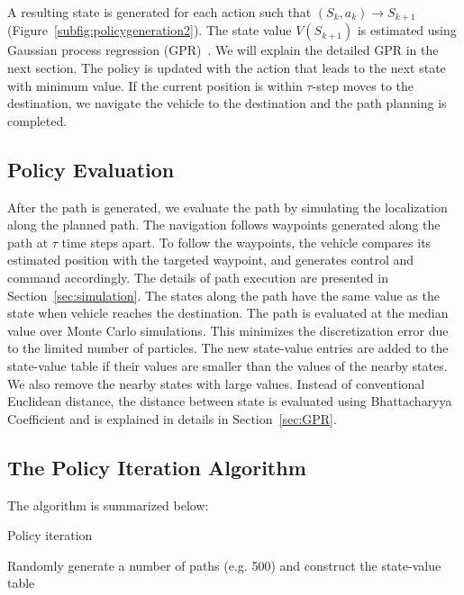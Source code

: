 A resulting state is generated for each action such that $(S_k,a_k)\rightarrow S_{k+1}$ (Figure~\ref{subfig:policygeneration2}). The state value $V(S_{k+1})$ is estimated using Gaussian process regression (GPR)~\cite{GPR}. We will explain the detailed GPR in the next section. The policy is updated with the action that leads to the next state with minimum value. If the current position is within $\tau$-step moves to the destination, we navigate the vehicle to the destination and the path planning is completed.

\subsection{Policy Evaluation}
After the path is generated, we evaluate the path by simulating the localization along the planned path. The navigation follows waypoints generated along the path at $\tau$ time steps apart. To follow the waypoints, the vehicle compares its estimated position with the targeted waypoint, and generates control and command accordingly. The details of path execution are presented in Section~\ref{sec:simulation}. The states along the path have the same value as the state when vehicle reaches the destination. The path is evaluated at the median value over Monte Carlo simulations. This minimizes the discretization error due to the limited number of particles. The new state-value entries are added to the state-value table if their values are smaller than the values of the nearby states. We also remove the nearby states with large values. Instead of conventional Euclidean distance, the distance between state is evaluated using Bhattacharyya Coefficient \cite{Comaniciu2000} and is explained in details in Section~\ref{sec:GPR}.

\subsection{The Policy Iteration Algorithm}
The algorithm is summarized below: \\

\begin{algorithm}
\caption{Policy iteration}
Randomly generate a number of paths (e.g. 500) and construct the state-value table %

\end{algorithm}

